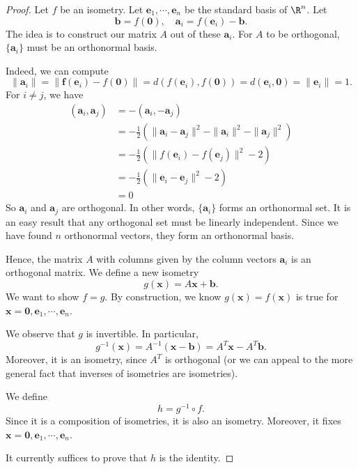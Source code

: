 \documentclass[a4paper]{article}
\begin{document}
\begin{proof}
  Let $f$ be an isometry. Let $\mathbf{e}_1, \cdots, \mathbf{e}_n$ be the standard basis of $\R^n$. Let
  \[
    \mathbf{b} = f(\mathbf{0}), \quad \mathbf{a}_i = f(\mathbf{e}_i) - \mathbf{b}.
  \]
  The idea is to construct our matrix $A$ out of these $\mathbf{a}_i$. For $A$ to be orthogonal, $\{\mathbf{a}_i\}$ must be an orthonormal basis.

  Indeed, we can compute
  \[
    \|\mathbf{a}_i\| = \|\mathbf{f}(\mathbf{e}_i) - f(\mathbf{0})\| = d(f(\mathbf{e}_i), f(\mathbf{0})) = d(\mathbf{e}_i, \mathbf{0}) = \|\mathbf{e}_i\| = 1.
  \]
  For $i \not = j$, we have
  \begin{align*}
    (\mathbf{a}_i, \mathbf{a}_j) &= -(\mathbf{a}_i, -\mathbf{a}_j) \\
    &=-\frac{1}{2}(\|\mathbf{a}_i - \mathbf{a}_j\|^2 - \|\mathbf{a}_i\|^2 - \|\mathbf{a}_j\|^2)\\
    &= -\frac{1}{2}(\|f(\mathbf{e}_i) - f(\mathbf{e}_j)\|^2 - 2)\\
    &= -\frac{1}{2}(\|\mathbf{e}_i - \mathbf{e}_j\|^2 - 2)\\
    &= 0
  \end{align*}
  So $\mathbf{a}_i$ and $\mathbf{a}_j$ are orthogonal. In other words, $\{\mathbf{a}_i\}$ forms an orthonormal set. It is an easy result that any orthogonal set must be linearly independent. Since we have found $n$ orthonormal vectors, they form an orthonormal basis.

  Hence, the matrix $A$ with columns given by the column vectors $\mathbf{a}_i$ is an orthogonal matrix. We define a new isometry
  \[
    g(\mathbf{x}) = A\mathbf{x} + \mathbf{b}.
  \]
  We want to show $f = g$. By construction, we know $g(\mathbf{x}) = f(\mathbf{x})$ is true for $\mathbf{x} = \mathbf{0}, \mathbf{e}_1, \cdots, \mathbf{e}_n$.

  We observe that $g$ is invertible. In particular,
  \[
    g^{-1}(\mathbf{x}) = A^{-1}(\mathbf{x} - \mathbf{b}) = A^T \mathbf{x} - A^T\mathbf{b}.
  \]
  Moreover, it is an isometry, since $A^T$ is orthogonal (or we can appeal to the more general fact that inverses of isometries are isometries).

  We define
  \[
    h = g^{-1}\circ f.
  \]
  Since it is a composition of isometries, it is also an isometry. Moreover, it fixes $\mathbf{x} = \mathbf{0}, \mathbf{e}_1, \cdots, \mathbf{e}_n$.

  It currently suffices to prove that $h$ is the identity.


\end{proof}
\end{document}
